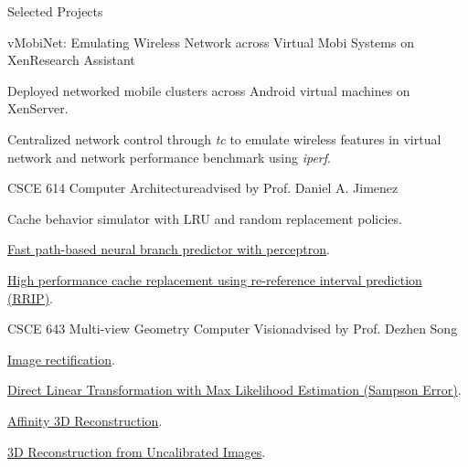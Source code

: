 \documentclass{resume} %
\begin{document}
\begin{rSection}{Selected Projects}
\begin{rSubsection}{vMobiNet: Emulating Wireless Network across Virtual Mobi Systems on Xen}{Research Assistant}{}{}
\item Deployed networked mobile clusters across Android virtual machines on XenServer.
\item Centralized network control through \emph{tc} to emulate wireless features in virtual network and network performance benchmark using \emph{iperf}.
\end{rSubsection}

\begin{rSubsection}{CSCE 614 Computer Architecture}{advised by Prof. Daniel A. Jimenez}{}{}
\item Cache behavior simulator with LRU and random replacement policies.
\item \href{https://github.com/vincenttsang/CompArch/blob/master/branch-predictor/p1-final-report/p1-final-report.pdf}{Fast path-based neural branch predictor with perceptron}.
\item \href{https://github.com/vincenttsang/CompArch/blob/master/cache-replacer/p2-final-report/p2-final-report.pdf}{High performance cache replacement using re-reference interval prediction (RRIP)}.
\end{rSubsection}

\begin{rSubsection}{CSCE 643 Multi-view Geometry Computer Vision}{advised by Prof. Dezhen Song}{}{}
\item \href{https://github.com/ykzeng/multiview-geo-cv/blob/master/docs/hw-1/bare_conf.pdf}{Image rectification}.
\item \href{https://github.com/ykzeng/multiview-geo-cv/blob/master/docs/hw-2/bare_conf.pdf}{Direct Linear Transformation with Max Likelihood Estimation (Sampson Error)}.
\item \href{https://github.com/ykzeng/multiview-geo-cv/blob/master/docs/hw-5/bare_conf.pdf}{Affinity 3D Reconstruction}.
\item \href{https://github.com/ykzeng/multiview-geo-cv/blob/master/docs/final-proj/proposal/bare_conf.pdf}{3D Reconstruction from Uncalibrated Images}.
\end{rSubsection}


\end{rSection}
\end{document}
